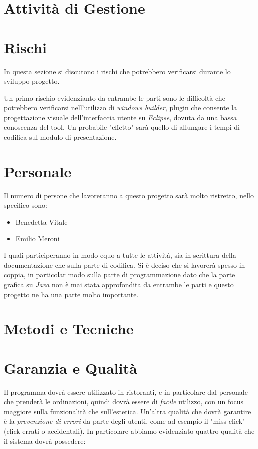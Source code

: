 \documentclass{book}
\begin{document}
\section{Attività di Gestione}


\section{Rischi}

In questa sezione si discutono i rischi che potrebbero verificarsi durante lo sviluppo progetto. 

Un primo rischio evidenzianto da entrambe le parti sono le difficoltà che potrebbero verificarsi nell'utilizzo di \textit{windows builder}, plugin che consente la progettazione visuale dell'interfaccia utente su \textit{Eclipse}, dovuta da una bassa conoscenza del tool. Un probabile "effetto" sarà quello di allungare i tempi di codifica sul modulo di presentazione.

\section{Personale}
Il numero di persone che lavoreranno a questo progetto sarà molto ristretto, nello specifico sono: 
\begin{itemize}
    \item Benedetta Vitale
    \item Emilio Meroni
\end{itemize}
I quali participeranno in modo equo a tutte le attività, sia in scrittura della documentazione che sulla parte di codifica. Si è deciso che si lavorerà spesso in coppia, in particolar modo sulla parte di programmazione dato che la parte grafica su \textit{Java} non è mai stata approfondita da entrambe le parti e questo progetto ne ha una parte molto importante.
     

\section{Metodi e Tecniche}



\section{Garanzia e Qualità}

Il programma dovrà essere utilizzato in ristoranti, e in particolare dal personale che prenderà le ordinazioni, quindi dovrà essere di \textit{facile} utilizzo, con un focus maggiore sulla funzionalità che sull'estetica. Un'altra qualità che dovrà garantire è la \textit{prevenzione di errori} da parte degli utenti, come ad esempio il "miss-click" (click errati o accidentali).
In particolare abbiamo evidenziato quattro qualità che il sistema dovrà possedere:
\end{document}
